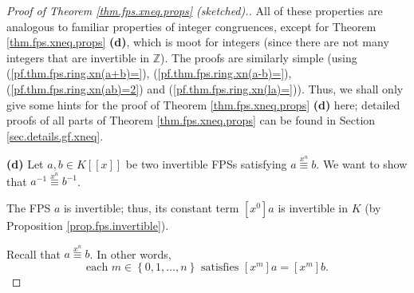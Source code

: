 \begin{proof}
[Proof of Theorem \ref{thm.fps.xneq.props} (sketched).]All of these properties
are analogous to familiar properties of integer congruences, except for
Theorem \ref{thm.fps.xneq.props} \textbf{(d)}, which is moot for integers
(since there are not many integers that are invertible in $\mathbb{Z}$). The
proofs are similarly simple (using (\ref{pf.thm.fps.ring.xn(a+b)=}),
(\ref{pf.thm.fps.ring.xn(a-b)=}), (\ref{pf.thm.fps.ring.xn(ab)=2}) and
(\ref{pf.thm.fps.ring.xn(la)=})). Thus, we shall only give some hints for the
proof of Theorem \ref{thm.fps.xneq.props} \textbf{(d)} here; detailed proofs
of all parts of Theorem \ref{thm.fps.xneq.props} can be found in Section
\ref{sec.details.gf.xneq}.

\textbf{(d)} Let $a,b\in K\left[  \left[  x\right]  \right]  $ be two
invertible FPSs satisfying $a\overset{x^{n}}{\equiv}b$. We want to show that
$a^{-1}\overset{x^{n}}{\equiv}b^{-1}$.

The FPS $a$ is invertible; thus, its constant term $\left[  x^{0}\right]  a$
is invertible in $K$ (by Proposition \ref{prop.fps.invertible}).

Recall that $a\overset{x^{n}}{\equiv}b$. In other words,
\begin{equation}
\text{each }m\in\left\{  0,1,\ldots,n\right\}  \text{ satisfies }\left[
x^{m}\right]  a=\left[  x^{m}\right]  b. \label{pf.thm.fps.xneq.props.d.ass}%
\end{equation}



\end{proof}
